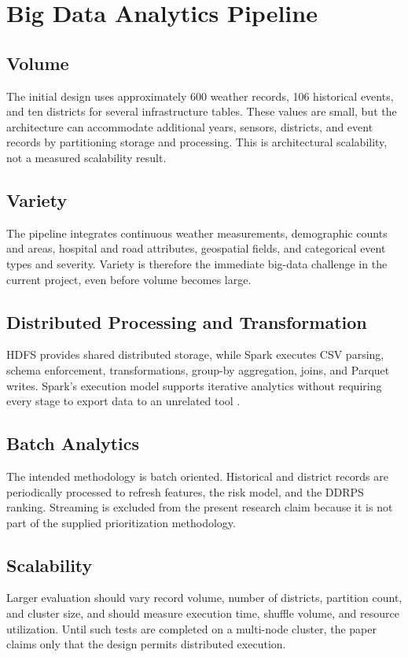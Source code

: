 \documentclass[conference]{IEEEtran}
\begin{document}
\section{Big Data Analytics Pipeline}

\subsection{Volume}
The initial design uses approximately 600 weather records, 106 historical
events, and ten districts for several infrastructure tables. These values are
small, but the architecture can accommodate additional years, sensors,
districts, and event records by partitioning storage and processing. This is
architectural scalability, not a measured scalability result.

\subsection{Variety}
The pipeline integrates continuous weather measurements, demographic counts and
areas, hospital and road attributes, geospatial fields, and categorical event
types and severity. Variety is therefore the immediate big-data challenge in
the current project, even before volume becomes large.

\subsection{Distributed Processing and Transformation}
HDFS provides shared distributed storage, while Spark executes CSV parsing,
schema enforcement, transformations, group-by aggregation, joins, and Parquet
writes. Spark's execution model supports iterative analytics without requiring
every stage to export data to an unrelated tool \cite{spark,mllib}.

\subsection{Batch Analytics}
The intended methodology is batch oriented. Historical and district records
are periodically processed to refresh features, the risk model, and the DDRPS
ranking. Streaming is excluded from the present research claim because it is
not part of the supplied prioritization methodology.

\subsection{Scalability}
Larger evaluation should vary record volume, number of districts, partition
count, and cluster size, and should measure execution time, shuffle volume, and
resource utilization. Until such tests are completed on a multi-node cluster,
the paper claims only that the design permits distributed execution.
\end{document}

